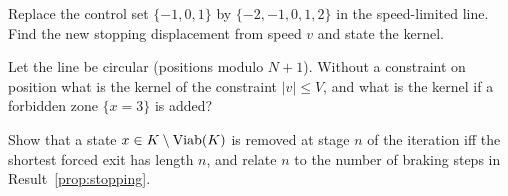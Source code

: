 \begin{exercise}
Replace the control set $\{-1,0,1\}$ by $\{-2,-1,0,1,2\}$ in the speed-limited line. Find the new stopping displacement from speed $v$ and state the kernel.\label{ex2:wide-control}
\end{exercise}

\begin{exercise}
Let the line be circular (positions modulo $N+1$). Without a constraint on position what is the kernel of the constraint $|v|\le V$, and what is the kernel if a forbidden zone $\{x=3\}$ is added?\label{ex2:circular}
\end{exercise}

\begin{exercise}
Show that a state $x\in K\setminus\operatorname{Viab}(K)$ is removed at stage $n$ of the iteration iff the shortest forced exit has length $n$, and relate $n$ to the number of braking steps in Result~\ref{prop:stopping}.
\end{exercise}

